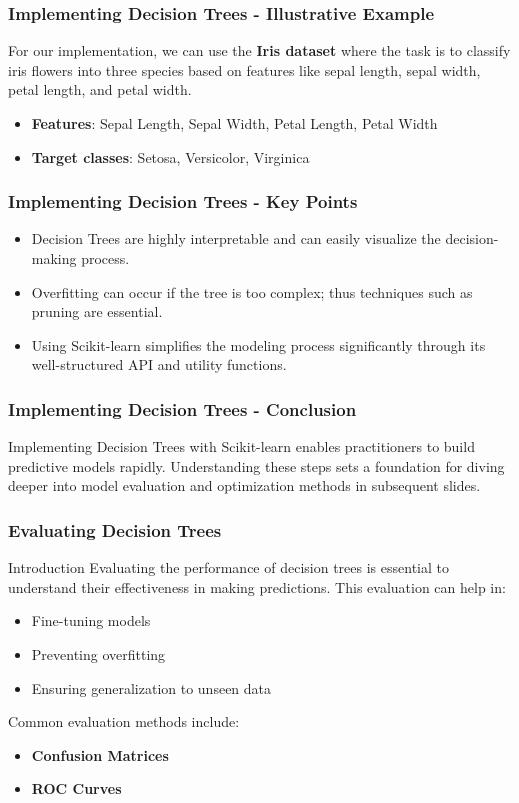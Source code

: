 \documentclass[aspectratio=169]{beamer}
\begin{document}
\begin{frame}[fragile]
    \frametitle{Implementing Decision Trees - Illustrative Example}
    For our implementation, we can use the \textbf{Iris dataset} where the task is to classify iris flowers into three species based on features like sepal length, sepal width, petal length, and petal width.

    \begin{itemize}
        \item \textbf{Features}: Sepal Length, Sepal Width, Petal Length, Petal Width
        \item \textbf{Target classes}: Setosa, Versicolor, Virginica
    \end{itemize}
\end{frame}

\begin{frame}[fragile]
    \frametitle{Implementing Decision Trees - Key Points}
    \begin{itemize}
        \item Decision Trees are highly interpretable and can easily visualize the decision-making process.
        \item Overfitting can occur if the tree is too complex; thus techniques such as pruning are essential.
        \item Using Scikit-learn simplifies the modeling process significantly through its well-structured API and utility functions.
    \end{itemize}
\end{frame}

\begin{frame}[fragile]
    \frametitle{Implementing Decision Trees - Conclusion}
    Implementing Decision Trees with Scikit-learn enables practitioners to build predictive models rapidly. Understanding these steps sets a foundation for diving deeper into model evaluation and optimization methods in subsequent slides.
\end{frame}

\begin{frame}[fragile]
  \frametitle{Evaluating Decision Trees}
  \begin{block}{Introduction}
    Evaluating the performance of decision trees is essential to understand their effectiveness in making predictions. This evaluation can help in:
    \begin{itemize}
      \item Fine-tuning models
      \item Preventing overfitting
      \item Ensuring generalization to unseen data
    \end{itemize}
    Common evaluation methods include:
    \begin{itemize}
      \item \textbf{Confusion Matrices}
      \item \textbf{ROC Curves}
    \end{itemize}
  \end{block}
\end{frame}
\end{document}
